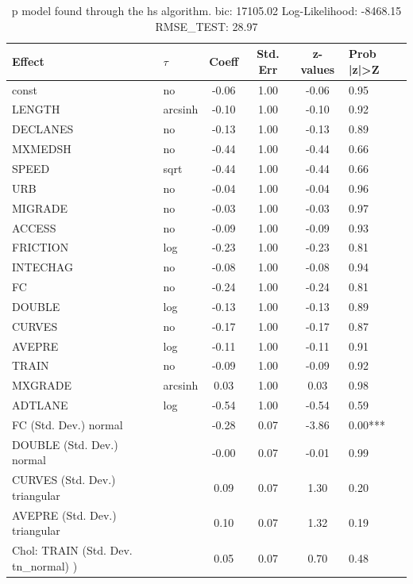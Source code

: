 \begin{table}
	\caption{p model found through the hs algorithm. bic: 17105.02 Log-Likelihood: -8468.15 RMSE_TEST: 28.97}
	\begin{center}
		\begin{tabular}{|l|l|c|c|c|l|}
			\hline
			Effect & $\tau$ & Coeff & Std. Err & z-values & Prob |z|>Z \\
			\hline
			const & no & -0.06 & 1.00 & -0.06 & 0.95 \\
			\hline
			LENGTH & arcsinh & -0.10 & 1.00 & -0.10 & 0.92 \\
			\hline
			DECLANES & no & -0.13 & 1.00 & -0.13 & 0.89 \\
			\hline
			MXMEDSH & no & -0.44 & 1.00 & -0.44 & 0.66 \\
			\hline
			SPEED & sqrt & -0.44 & 1.00 & -0.44 & 0.66 \\
			\hline
			URB & no & -0.04 & 1.00 & -0.04 & 0.96 \\
			\hline
			MIGRADE & no & -0.03 & 1.00 & -0.03 & 0.97 \\
			\hline
			ACCESS & no & -0.09 & 1.00 & -0.09 & 0.93 \\
			\hline
			FRICTION & log & -0.23 & 1.00 & -0.23 & 0.81 \\
			\hline
			INTECHAG & no & -0.08 & 1.00 & -0.08 & 0.94 \\
			\hline
			FC & no & -0.24 & 1.00 & -0.24 & 0.81 \\
			\hline
			DOUBLE & log & -0.13 & 1.00 & -0.13 & 0.89 \\
			\hline
			CURVES & no & -0.17 & 1.00 & -0.17 & 0.87 \\
			\hline
			AVEPRE & log & -0.11 & 1.00 & -0.11 & 0.91 \\
			\hline
			TRAIN & no & -0.09 & 1.00 & -0.09 & 0.92 \\
			\hline
			MXGRADE & arcsinh & 0.03 & 1.00 & 0.03 & 0.98 \\
			\hline
			ADTLANE & log & -0.54 & 1.00 & -0.54 & 0.59 \\
			\hline
			FC (Std. Dev.) normal &  & -0.28 & 0.07 & -3.86 & 0.00*** \\
			\hline
			DOUBLE (Std. Dev.) normal &  & -0.00 & 0.07 & -0.01 & 0.99 \\
			\hline
			CURVES (Std. Dev.) triangular &  & 0.09 & 0.07 & 1.30 & 0.20 \\
			\hline
			AVEPRE (Std. Dev.) triangular &  & 0.10 & 0.07 & 1.32 & 0.19 \\
			\hline
			 Chol: TRAIN (Std. Dev. tn_normal) ) &  & 0.05 & 0.07 & 0.70 & 0.48 \\

\end{tabular}
\end{center}
\end{table}
